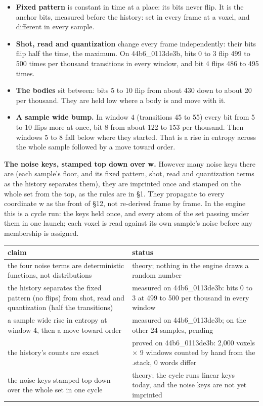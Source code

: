 \begin{itemize}
\item \textbf{Fixed pattern} is constant in time at a place: its bits never flip. It is the anchor bits, measured before the history: set in every frame at a voxel, and different in every sample.
\item \textbf{Shot, read and quantization} change every frame independently: their bits flip half the time, the maximum. On 44b6\_\allowbreak{}0113de3b, bits 0 to 3 flip 499 to 500 times per thousand transitions in every window, and bit 4 flips 486 to 495 times.
\item \textbf{The bodies} sit between: bits 5 to 10 flip from about 430 down to about 20 per thousand. They are held low where a body is and move with it.
\item \textbf{A sample wide bump.} In window 4 (transitions 45 to 55) every bit from 5 to 10 flips more at once, bit 8 from about 122 to 153 per thousand. Then windows 5 to 8 fall below where they started. That is a rise in entropy across the whole sample followed by a move toward order.
\end{itemize}

\textbf{The noise keys, stamped top down over w.} However many noise keys there are (each sample's floor, and its fixed pattern, shot, read and quantization terms as the history separates them), they are imprinted once and stamped on the whole set from the top, as the rules are in §1. They propagate to every coordinate w as the front of §12, not re-derived frame by frame. In the engine this is a cycle run: the keys held once, and every atom of the set passing under them in one launch; each voxel is read against its own sample's noise before any membership is assigned.

{\small
\setlength{\tabcolsep}{6pt}
\begin{longtable}{>{\RaggedRight\arraybackslash}p{}>{\RaggedRight\arraybackslash}p{}}
\toprule
claim & status \\
\midrule
\endhead
the four noise terms are deterministic functions, not distributions & theory; nothing in the engine draws a random number \\
the history separates the fixed pattern (no flips) from shot, read and quantization (half the transitions) & measured on 44b6\_\allowbreak{}0113de3b: bits 0 to 3 at 499 to 500 per thousand in every window \\
a sample wide rise in entropy at window 4, then a move toward order & measured on 44b6\_\allowbreak{}0113de3b; on the other 24 samples, pending \\
the history's counts are exact & proved on 44b6\_\allowbreak{}0113de3b: 2,000 voxels × 9 windows counted by hand from the .stack, 0 words differ \\
the noise keys stamped top down over the whole set in one cycle & theory; the cycle runs linear keys today, and the noise keys are not yet imprinted \\
\bottomrule
\end{longtable}
}

